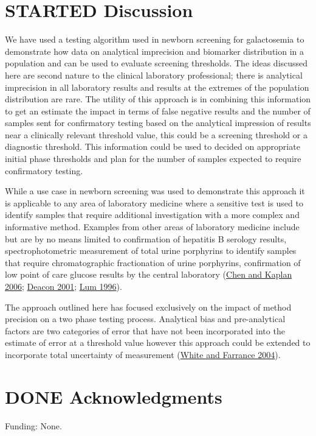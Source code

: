 \documentclass[review]{elsarticle}
\begin{document}
\clearpage

\section*{{\bfseries\sffamily STARTED} Discussion}
\label{sec:org2f8f351}

We have used a testing algorithm used in newborn screening for
galactosemia to demonstrate how data on analytical imprecision and
biomarker distribution in a population and can be used to evaluate
screening thresholds. The ideas discussed here are second nature to
the clinical laboratory professional; there is analytical imprecision
in all laboratory results and results at the extremes of the
population distribution are rare. The utility of this approach is in
combining this information to get an estimate the impact in terms of
false negative results and the number of samples sent for confirmatory
testing based on the analytical impression of results near a
clinically relevant threshold value, this could be a screening
threshold or a diagnostic threshold. This information could be used to
decided on appropriate initial phase thresholds and plan for the
number of samples expected to require confirmatory testing.

While a use case in newborn screening was used to demonstrate this
approach it is applicable to any area of laboratory medicine where a
sensitive test is used to identify samples that require additional
investigation with a more complex and informative method. Examples
from other areas of laboratory medicine include but are by no means
limited to confirmation of hepatitis B serology results,
spectrophotometric measurement of total urine porphyrins to identify
samples that require chromatographic fractionation of urine
porphyrins, confirmation of low point of care glucose results by the
central laboratory (\hyperlink{citeproc_bib_item_2}{Chen and Kaplan 2006}; \hyperlink{citeproc_bib_item_3}{Deacon 2001}; \hyperlink{citeproc_bib_item_4}{Lum 1996}).

The approach outlined here has focused exclusively on the impact of
method precision on a two phase testing process. Analytical bias and
pre-analytical factors are two categories of error that have not been
incorporated into the estimate of error at a threshold value however
this approach could be extended to incorporate total uncertainty of
measurement (\hyperlink{citeproc_bib_item_7}{White and Farrance 2004}).

\section*{{\bfseries\sffamily DONE} Acknowledgments}
\label{sec:org79b7487}
Funding: None.
\end{document}
